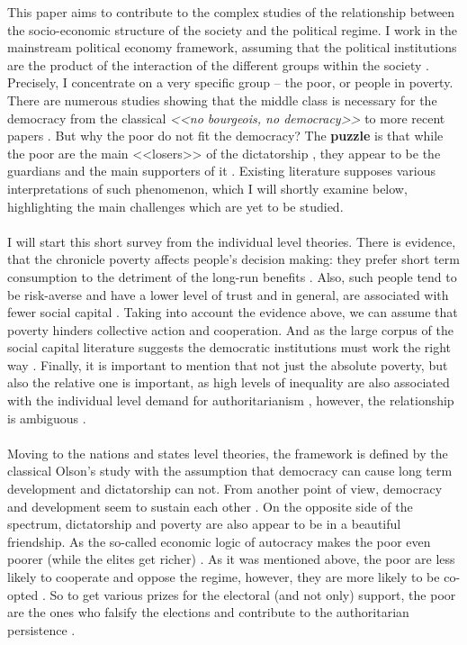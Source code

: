 \documentclass[a4paper, 12pt]{article}
\begin{document}
\noindent This paper aims to contribute to the complex studies of the relationship between the socio-economic structure of the society and the political regime. I work in the mainstream political economy framework, assuming that the political institutions are the product of the interaction of the different groups within the society \parencite{inst_per, why_fail}. Precisely, I concentrate on a very specific group -- the poor, or people in poverty. There are numerous studies showing that the middle class is necessary for the democracy from the classical \textit{<<no bourgeois, no democracy>>} \parencite{social_origins} to more recent papers \parencite{econ_origins, corridor}. But why the poor do not fit the democracy? The \textbf{puzzle} is that while the poor are the main <<losers>> of the dictatorship \parencite{political_roots}, they appear to be the guardians and the main supporters of it \parencite{voting_for_autocracy}. Existing literature supposes various interpretations of such phenomenon, which I will shortly examine below, highlighting the main challenges which are yet to be studied.
	\\\\
	\noindent I will start this short survey from the individual level theories. There is evidence, that the chronicle poverty affects people's decision making: they prefer short term consumption to the detriment of the long-run benefits \parencite{poverty_consequences}. Also, such people tend to be risk-averse \parencite{poverty_risk} and have a lower level of trust \parencite{trust_poverty} and in general, are associated with fewer social capital \parencite{poverty_capital3}. Taking into account the evidence above, we can assume that poverty hinders collective action and cooperation. And as the large corpus of the social capital literature suggests the democratic institutions must work the right way \parencite{bowling, social_capital_democracy}. Finally, it is important to mention that not just the absolute poverty, but also the relative one is important, as high levels of inequality are also associated with the individual level demand for authoritarianism \parencite{relative_power}, however, the relationship is ambiguous \parencite{inequality_regimes, regimes_inequality}.  
	\\\\
	Moving to the nations and states level theories, the framework is defined by the classical Olson's study \parencite{regime_development} with the assumption that democracy can cause long term development and dictatorship can not. From another point of view, democracy and development seem to sustain each other \parencite{democracy_development}. On the opposite side of the spectrum, dictatorship and poverty are also appear to be in a beautiful friendship. As the so-called economic logic of autocracy makes the poor even poorer (while the elites get richer) \parencite{handbook}. As it was mentioned above, the poor are less likely to cooperate and oppose the regime, however, they are more likely to be co-opted \parencite{three_pilars, toolkit}. So to get various prizes for the electoral (and not only) support, the poor are the ones who falsify the elections and contribute to the authoritarian persistence \parencite{more_than_win}.
	
\end{document}

